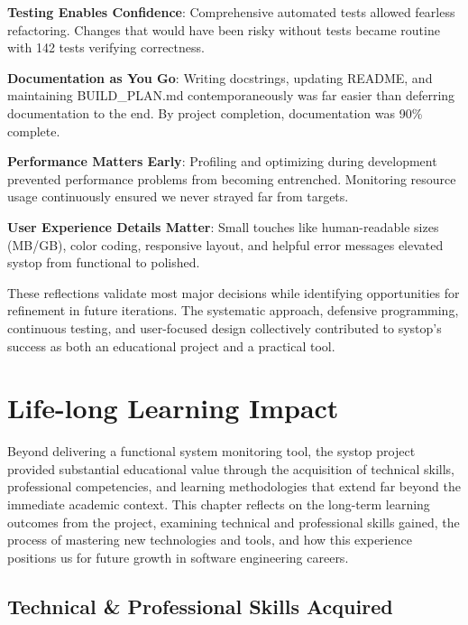 \documentclass[12pt,a4paper,oneside]{report}
\begin{document}
\textbf{Testing Enables Confidence}: Comprehensive automated tests allowed fearless refactoring. Changes that would have been risky without tests became routine with 142 tests verifying correctness.

\textbf{Documentation as You Go}: Writing docstrings, updating README, and maintaining BUILD\_PLAN.md contemporaneously was far easier than deferring documentation to the end. By project completion, documentation was 90\% complete.

\textbf{Performance Matters Early}: Profiling and optimizing during development prevented performance problems from becoming entrenched. Monitoring resource usage continuously ensured we never strayed far from targets.

\textbf{User Experience Details Matter}: Small touches like human-readable sizes (MB/GB), color coding, responsive layout, and helpful error messages elevated systop from functional to polished.

These reflections validate most major decisions while identifying opportunities for refinement in future iterations. The systematic approach, defensive programming, continuous testing, and user-focused design collectively contributed to systop's success as both an educational project and a practical tool.

\chapter{Life-long Learning Impact}
\label{chap:learning-impact}

Beyond delivering a functional system monitoring tool, the systop project provided substantial educational value through the acquisition of technical skills, professional competencies, and learning methodologies that extend far beyond the immediate academic context. This chapter reflects on the long-term learning outcomes from the project, examining technical and professional skills gained, the process of mastering new technologies and tools, and how this experience positions us for future growth in software engineering careers.

\section{Technical \& Professional Skills Acquired}
\label{sec:skills-acquired}
\end{document}

